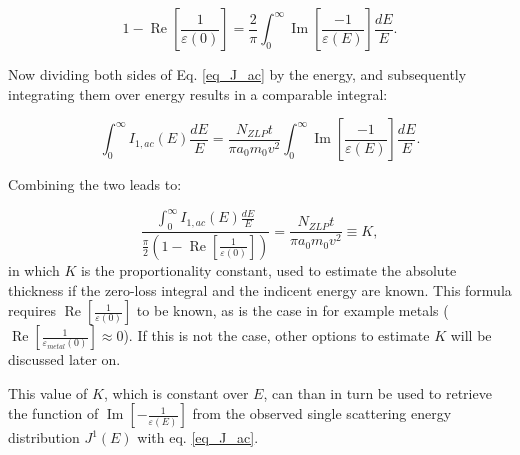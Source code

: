 \begin{equation}
    1-\operatorname{Re}\left[\frac{1}{\varepsilon(0)}\right]=\frac{2}{\pi} \int_{0}^{\infty} \operatorname{Im}\left[\frac{-1}{\varepsilon(E)}\right] \frac{d E}{E}.
\end{equation}

Now dividing both sides of Eq. \eqref{eq_J_ac} by the energy, and subsequently integrating them over energy results in a comparable integral:

\begin{equation}\label{eq_J_ac}
    \int_{0}^{\infty} I_{1,ac}(E) \frac{d E}{E}=  \frac{N_{ZLP} t}{\pi a_{0} m_{0} v^{2}}  \int_{0}^{\infty} \operatorname{Im}\left[\frac{-1}{\varepsilon(E)}\right]   \frac{d E}{E} .
\end{equation}

Combining the two leads to:

\begin{equation}
    \frac{\int_{0}^{\infty} I_{1,ac}(E) \frac{d E}{E}}{\frac{\pi}{2}(1-\operatorname{Re}\left[\frac{1}{\varepsilon(0)}\right])} = \frac{N_{ZLP} t}{\pi a_{0} m_{0} v^{2}} \equiv K ,
\end{equation}
in which $K$ is the proportionality constant, used to estimate the absolute thickness if the zero-loss integral and the indicent energy are known. This formula requires $\operatorname{Re}\left[\frac{1}{\varepsilon(0)}\right]$ to be known, as is the case in for example metals ($\operatorname{Re}\left[\frac{1}{\varepsilon_{metal}(0)}\right]\approx 0$). If this is not the case, other options to estimate $K$ will be discussed later on.

This value of $K$, which is constant over $E$, can than in turn be used to retrieve the function of $\operatorname{Im}\left[-\frac{1}{\varepsilon(E)}\right]$ from the observed single scattering energy distribution $J^1(E)$ with eq. \eqref{eq_J_ac}.



